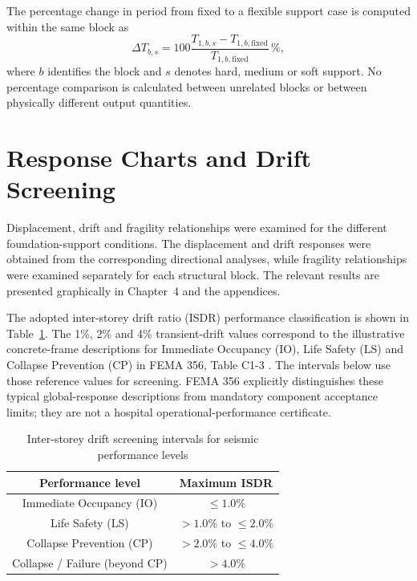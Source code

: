 The percentage change in period from fixed to a flexible support case is computed within the same block as
\begin{equation}
\Delta T_{b,s}=100\frac{T_{1,b,s}-T_{1,b,\mathrm{fixed}}}{T_{1,b,\mathrm{fixed}}}\,\%,
\label{eq:ssi_sensitivity}
\end{equation}
where $b$ identifies the block and $s$ denotes hard, medium or soft support. No percentage comparison is calculated between unrelated blocks or between physically different output quantities.

\section{Response Charts and Drift Screening}
Displacement, drift and fragility relationships were examined for the different foundation-support conditions. The displacement and drift responses were obtained from the corresponding directional analyses, while fragility relationships were examined separately for each structural block. The relevant results are presented graphically in Chapter~4 and the appendices.

The adopted inter-storey drift ratio (ISDR) performance classification is shown in Table~\ref{tab:legacy_isdr_performance_bands}. The 1\%, 2\% and 4\% transient-drift values correspond to the illustrative concrete-frame descriptions for Immediate Occupancy (IO), Life Safety (LS) and Collapse Prevention (CP) in FEMA 356, Table C1-3 \cite{fema356}. The intervals below use those reference values for screening. FEMA 356 explicitly distinguishes these typical global-response descriptions from mandatory component acceptance limits; they are not a hospital operational-performance certificate.

\begin{table}[htbp]
\fontsize{11}{13}\selectfont\setlength{\tabcolsep}{4pt}
\caption{Inter-storey drift screening intervals for seismic performance levels}
\label{tab:legacy_isdr_performance_bands}\centering\renewcommand{\arraystretch}{0.90}
\begin{tabular*}{\linewidth}{@{\extracolsep{\fill}}cc@{}}
\toprule
Performance level & Maximum ISDR \\ \midrule
Immediate Occupancy (IO) & $\leq 1.0\%$ \\
Life Safety (LS) & $>1.0\%$ to $\leq 2.0\%$ \\
Collapse Prevention (CP) & $>2.0\%$ to $\leq 4.0\%$ \\
Collapse / Failure (beyond CP) & $>4.0\%$ \\ \bottomrule
\end{tabular*}
\end{table}

